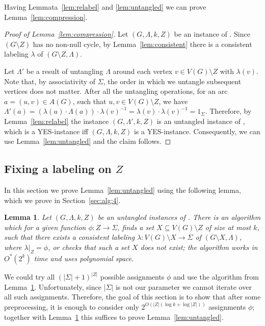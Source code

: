 \documentclass[11pt]{article}
\newtheorem{lemma}[theorem]{Lemma}
\theoremstyle{definition}
\newcommand{\cgfvsshort}{{\sc{C-GFVS}}\xspace}
\newcommand{\Ohstar}{\ensuremath{O^\ast}}
\begin{document}
Having Lemmata~\ref{lem:relabel} and \ref{lem:untangled} we can prove Lemma~\ref{lem:compression}.

\begin{proof}[Proof of Lemma~\ref{lem:compression}]
Let $(G,\Lambda,k,Z)$ be an instance of \cgfvsshort.
Since $(G\setminus Z)$ has no non-null cycle, by Lemma~\ref{lem:consistent}
there is a consistent labeling $\lambda$ of $(G\setminus Z, \Lambda)$.

Let $\Lambda'$ be a result of untangling $\Lambda$ around each
vertex $v \in V(G)\setminus Z$ with $\lambda(v)$. 
Note that, by associativity of $\Sigma$, the order in which we untangle subsequent vertices does not matter.
After all the untangling operations, for an arc $a=(u,v) \in A(G)$,
such that $u,v \in V(G) \setminus Z$, we have $\Lambda'(a) = (\lambda(u) \cdot \Lambda(a)) \cdot \lambda(v)^{-1} = \lambda(v) \cdot \lambda(v)^{-1} = 1_\Sigma$.
Therefore, by Lemma~\ref{lem:relabel} the instance $(G,\Lambda',k,Z)$
is an untangled instance of \cgfvsshort, which is a YES-instance
iff $(G,\Lambda,k,Z)$ is a YES-instance.
Consequently, we can use Lemma~\ref{lem:untangled} and the claim follows.
\end{proof}

\subsection{Fixing a labeling on $Z$}
\label{sec:alg:3}

In this section we prove Lemma~\ref{lem:untangled} using the following lemma, which we prove in Section~\ref{sec:alg:4}.

\begin{lemma}
\label{lem:fixed}
Let $(G,\Lambda,k,Z)$ be an untangled instances of \cgfvsshort.
There is an algorithm which for a given
function $\phi:Z\rightarrow \Sigma$,
finds a set $X \subseteq V(G)\setminus Z$ of size at most $k$,
such that there exists a consistent labeling 
$\lambda:V(G)\setminus X \rightarrow \Sigma$ of $(G\setminus X,\Lambda)$,
where $\lambda|_{Z} = \phi$,
or checks that such a set $X$ does not exist; the algorithm works in $\Ohstar(2^k)$ time and uses polynomial space.
\end{lemma}

We could try all $(|\Sigma|+1)^{|Z|}$
possible assignments $\phi$ and use the algorithm from Lemma~\ref{lem:fixed}.
Unfortunately, since $|\Sigma|$ is not our parameter we cannot 
iterate over all such assignments. Therefore, the goal of
this section is to show that after some preprocessing,
it is enough to consider only $2^{O(|Z|(\log k + \log |Z|))}$ assignments $\phi$; together with Lemma~\ref{lem:fixed} this suffices to prove Lemma~\ref{lem:untangled}.
\end{document}
